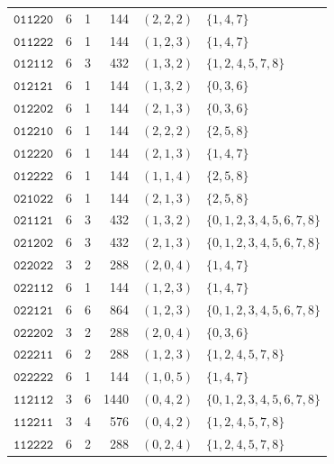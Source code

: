 \begin{table}[!htbp]
\begin{tabular}{@{}lrrrrl@{}}
\(\mathtt{011220}\)&6&1&144&\((2,2,2)\)&\(\{1,4,7\}\)\\
\(\mathtt{011222}\)&6&1&144&\((1,2,3)\)&\(\{1,4,7\}\)\\
\(\mathtt{012112}\)&6&3&432&\((1,3,2)\)&\(\{1,2,4,5,7,8\}\)\\
\(\mathtt{012121}\)&6&1&144&\((1,3,2)\)&\(\{0,3,6\}\)\\
\(\mathtt{012202}\)&6&1&144&\((2,1,3)\)&\(\{0,3,6\}\)\\
\(\mathtt{012210}\)&6&1&144&\((2,2,2)\)&\(\{2,5,8\}\)\\
\(\mathtt{012220}\)&6&1&144&\((2,1,3)\)&\(\{1,4,7\}\)\\
\(\mathtt{012222}\)&6&1&144&\((1,1,4)\)&\(\{2,5,8\}\)\\
\(\mathtt{021022}\)&6&1&144&\((2,1,3)\)&\(\{2,5,8\}\)\\
\(\mathtt{021121}\)&6&3&432&\((1,3,2)\)&\(\{0,1,2,3,4,5,6,7,8\}\)\\
\(\mathtt{021202}\)&6&3&432&\((2,1,3)\)&\(\{0,1,2,3,4,5,6,7,8\}\)\\
\(\mathtt{022022}\)&3&2&288&\((2,0,4)\)&\(\{1,4,7\}\)\\
\(\mathtt{022112}\)&6&1&144&\((1,2,3)\)&\(\{1,4,7\}\)\\
\(\mathtt{022121}\)&6&6&864&\((1,2,3)\)&\(\{0,1,2,3,4,5,6,7,8\}\)\\
\(\mathtt{022202}\)&3&2&288&\((2,0,4)\)&\(\{0,3,6\}\)\\
\(\mathtt{022211}\)&6&2&288&\((1,2,3)\)&\(\{1,2,4,5,7,8\}\)\\
\(\mathtt{022222}\)&6&1&144&\((1,0,5)\)&\(\{1,4,7\}\)\\
\(\mathtt{112112}\)&3&6&1440&\((0,4,2)\)&\(\{0,1,2,3,4,5,6,7,8\}\)\\
\(\mathtt{112211}\)&3&4&576&\((0,4,2)\)&\(\{1,2,4,5,7,8\}\)\\
\(\mathtt{112222}\)&6&2&288&\((0,2,4)\)&\(\{1,2,4,5,7,8\}\)\\
\bottomrule
\end{tabular}
\end{table}
